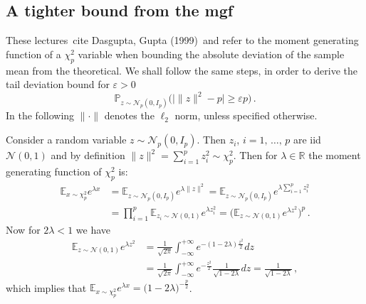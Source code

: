 \documentclass[a4paper,10pt]{article}
\begin{document}
\subsection{A tighter bound from the mgf} %
\label{sub:a_tighter_bound_from_the_mgf}

These lectures\footnotemark ~cite
Dasgupta, Gupta (1999)\footnotemark ~and refer to
the moment generating function of a $\chi^2_p$ variable when bounding the absolute
deviation of the sample mean from the theoretical. We shall follow the same steps,
in order to derive the tail deviation bound for $\varepsilon > 0$
$$
  \mathbb{P}_{z \sim \mathcal{N}_p(0, I_p)}\bigl(
    \lvert \|z\|^2 - p \rvert \geq \varepsilon p
  \bigr)
  \,. $$
In the following $\|\cdot\|$ denotes the $\ell_2$ norm, unless specified otherwise.

Consider a random variable $z\sim \mathcal{N}_p(0, I_p)$. Then $z_i$, $i=1,\,\ldots,\,p$
are iid $\mathcal{N}(0, 1)$ and by definition $\|z\|^2 = \sum_{i=1}^p z_i^2 \sim \chi^2_p$.
Then for $\lambda \in \mathbb{R}$ the moment generating function of $\chi^2_p$ is:
\begin{align*}
  \mathbb{E}_{x \sim \chi^2_p} e^{\lambda x}
    &= \mathbb{E}_{z\sim \mathcal{N}_p(0, I_p)} e^{\lambda \|z\|^2}
    = \mathbb{E}_{z\sim \mathcal{N}_p(0, I_p)} e^{\lambda \sum_{i=1}^p z_i^2}
    \\
    &= \prod_{i=1}^p \mathbb{E}_{z_i\sim \mathcal{N}(0, 1)} e^{\lambda z_i^2}
    = \biggl( \mathbb{E}_{z\sim \mathcal{N}(0, 1)} e^{\lambda z^2} \biggr)^p
    \,.
\end{align*}
Now for $2 \lambda < 1$ we have
\begin{align*}
  \mathbb{E}_{z\sim \mathcal{N}(0, 1)} e^{\lambda z^2}
    &= \tfrac1{\sqrt{2 \pi}} \int_{- \infty}^{+ \infty}
      e^{- (1 - 2 \lambda) \tfrac{z^2}2} dz
    \\
    &= \tfrac1{\sqrt{2 \pi}} \int_{-\infty}^{+\infty}
      e^{-\tfrac{z^2}2} \tfrac1{\sqrt{1 - 2 \lambda}} dz
    = \tfrac1{\sqrt{1 - 2 \lambda}}
    \,,
\end{align*}
which implies that $\mathbb{E}_{x\sim \chi^2_p} e^{\lambda x} = \bigl(1 - 2 \lambda\bigr)^{-\tfrac{p}2}$.
\end{document}
